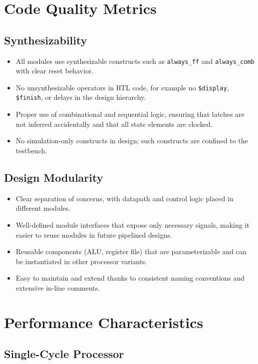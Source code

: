 \section{Code Quality Metrics}

\subsection{Synthesizability}

\begin{itemize}
    \item All modules use synthesizable constructs such as \texttt{always\_ff} and \texttt{always\_comb} with clear reset behavior.
    \item No unsynthesizable operators in RTL code, for example no \texttt{\$display}, \texttt{\$finish}, or delays in the design hierarchy.
    \item Proper use of combinational and sequential logic, ensuring that latches are not inferred accidentally and that all state elements are clocked.
    \item No simulation-only constructs in design; such constructs are confined to the testbench.
\end{itemize}

\subsection{Design Modularity}

\begin{itemize}
    \item Clear separation of concerns, with datapath and control logic placed in different modules.
    \item Well-defined module interfaces that expose only necessary signals, making it easier to reuse modules in future pipelined designs.
    \item Reusable components (ALU, register file) that are parameterizable and can be instantiated in other processor variants.
    \item Easy to maintain and extend thanks to consistent naming conventions and extensive in-line comments.
\end{itemize}

\section{Performance Characteristics}

\subsection{Single-Cycle Processor}


